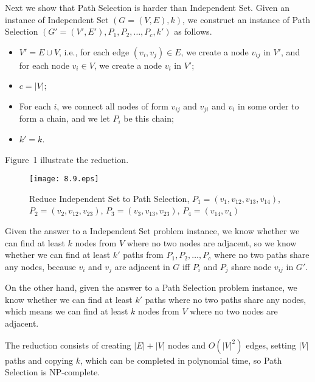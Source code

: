 \documentclass[12pt,letterpaper]{article}
\begin{document}
Next we show that Path Selection is harder than Independent Set. Given an instance of Independent Set $(G=(V,E), k)$, we construct an instance of Path Selection $(G'=(V',E'), P_1, P_2, \dots, P_c, k')$ as follows.
\begin{itemize}
\item $V' = E\cup V$, i.e., for each edge $(v_i, v_j)\in E$, we create a node $v_{ij}$ in $V'$, and for each node $v_i\in V$, we create a node $v_i$ in $V'$;
\item $c = |V|$;
\item For each $i$, we connect all nodes of form $v_{ij}$ and $v_{ji}$ and $v_i$ in some order to form a chain, and we let $P_i$ be this chain;
\item $k'=k$.
\end{itemize}
Figure~1 illustrate the reduction.
\begin{figure}[h]
\begin{center}
\texttt{[image: 8.9.eps]}
\caption{Reduce Independent Set to Path Selection, $P_1=(v_1, v_{12}, v_{13}, v_{14})$, $P_2=(v_2, v_{12}, v_{23})$, $P_3=(v_3, v_{13}, v_{23})$, $P_4=(v_{14}, v_4)$}
\end{center}
\end{figure}

Given the answer to a Independent Set problem instance, we know whether we can find at least $k$ nodes from $V$ where no two nodes are adjacent, so we know whether we can find at least $k'$ paths from $P_1, P_2, \dots, P_c$ where no two paths share any nodes, because $v_i$ and $v_j$ are adjacent in $G$ iff $P_i$ and $P_j$ share node $v_{ij}$ in $G'$.

On the other hand, given the answer to a Path Selection problem instance, we know whether we can find at least $k'$ paths where no two paths share any nodes, which means we can find at least $k$ nodes from $V$ where no two nodes are adjacent.

The reduction consists of creating $|E|+|V|$ nodes and $O(|V|^2)$ edges, setting $|V|$ paths and copying $k$, which can be completed in polynomial time, so Path Selection is NP-complete.
\end{document}
